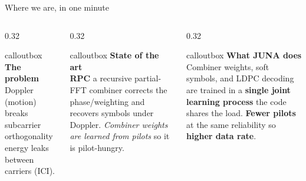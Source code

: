 \documentclass[aspectratio=169,10pt]{beamer}
\begin{document}
\begin{frame}{Where we are, in one minute}
  \vspace{0.1cm}
  \begin{columns}[T,onlytextwidth]
    \begin{column}{0.32\textwidth}
      \begin{beamercolorbox}[wd=\linewidth,sep=6pt,rounded=true]{calloutbox}
        \textbf{\color{rpc} The problem}\\[0.2em]
        \scriptsize Doppler (motion) breaks subcarrier orthogonality \textendash{} energy leaks between carriers (ICI).
      \end{beamercolorbox}
    \end{column}
    \begin{column}{0.32\textwidth}
      \begin{beamercolorbox}[wd=\linewidth,sep=6pt,rounded=true]{calloutbox}
        \textbf{\color{accent} State of the art}\\[0.2em]
        \scriptsize \textbf{RPC} \textendash{} a recursive partial-FFT combiner \textendash{} corrects the phase/weighting and recovers symbols under Doppler. \emph{Combiner weights are learned from pilots} \textendash{} so it is pilot-hungry.
      \end{beamercolorbox}
    \end{column}
    \begin{column}{0.32\textwidth}
      \begin{beamercolorbox}[wd=\linewidth,sep=6pt,rounded=true]{calloutbox}
        \textbf{\color{juna} What JUNA does}\\[0.2em]
        \scriptsize Combiner weights, soft symbols, and LDPC decoding are trained in a \textbf{single joint learning process} \textendash{} the code shares the load. \textbf{Fewer pilots} at the same reliability \textendash{} so \textbf{higher data rate}.
      \end{beamercolorbox}
    \end{column}
  \end{columns}


\end{frame}
\end{document}
